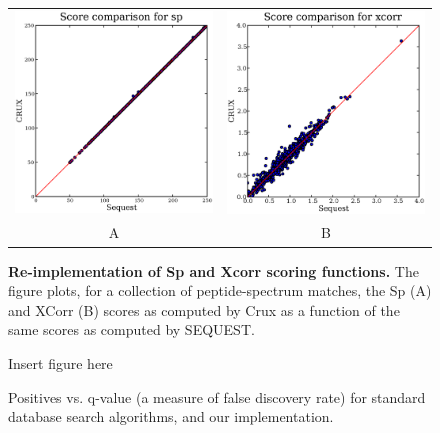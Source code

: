 \documentclass{bioinfo}
\begin{document}
\begin{figure}
  \centering
  \begin{tabular}{cc}
    \includegraphics[width=3in]{./Images/random-sp.eps} &
    \includegraphics[width=3in]{./Images/random-xcorr.eps} \\
  A & B \\
  \end{tabular}
  \caption{{\bf Re-implementation of Sp and Xcorr scoring functions.}
  The figure plots, for a collection of peptide-spectrum matches, the
  Sp (A) and XCorr (B) scores as computed by Crux as a function of the
  same scores as computed by SEQUEST.
  \label{figure:sp-xcorr}}
\end{figure}

\begin{figure}
  \centering
  Insert figure here
  \caption{Positives vs. q-value (a measure of false discovery rate) for
  standard database search algorithms, and our implementation.}
  \label{figure:pq-plot}
\end{figure}
\end{document}
